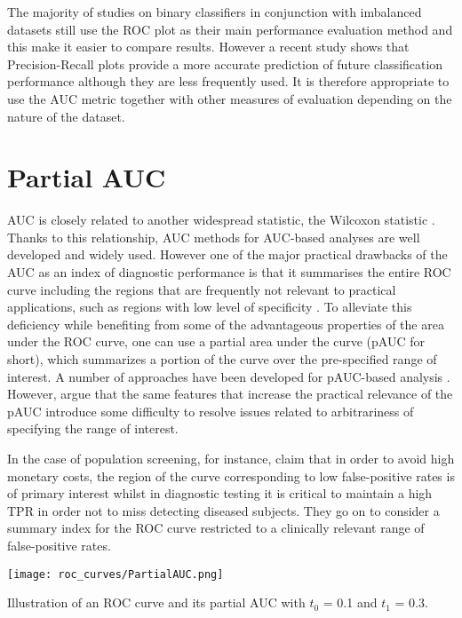 The majority of studies on binary classifiers in conjunction with imbalanced datasets still use the ROC plot as their main performance evaluation method and this make it easier to compare results. However a recent study \citep{saito2015prplotimbdata} shows that Precision-Recall plots provide a more accurate prediction of future classification performance although they are less frequently used. It is therefore appropriate to use the AUC metric together with other measures of evaluation depending on the nature of the dataset.

\section{Partial AUC} 
AUC is closely related to another widespread statistic, the Wilcoxon statistic \citep{hanley1982useauc}. Thanks to this relationship, AUC methods for AUC-based analyses are well developed and widely used. However one of the major practical drawbacks of the AUC as an index of diagnostic performance is that it summarises the entire ROC curve including the regions that are frequently not relevant to practical applications, such as regions with low level of specificity \citep{ma2013paucdiagperf}. To alleviate this deficiency while benefiting from some of the advantageous properties of the area under the ROC curve, one can use a partial area under the curve (pAUC for short), which summarizes a portion of the curve over the pre-specified range of interest. A number of approaches have been developed for pAUC-based analysis \citep{dodd2003pauc,he2010nonparagenomic}. However, \citet{ma2013paucdiagperf} argue that the same features that increase the practical relevance of the pAUC introduce some difficulty to resolve issues related to arbitrariness of specifying the range of interest. 

In the case of population screening, for instance, \citet{dodd2003pauc} claim that in order to avoid high monetary costs, the region of the curve corresponding to low false-positive rates is of primary interest whilst in diagnostic testing it is critical to maintain a high TPR in order not to miss detecting diseased subjects. They go on to consider a summary index for the ROC curve restricted to a clinically relevant range of false-positive rates.

\begin{marginfigure}
	\texttt{[image: roc\_curves/PartialAUC.png]}
	\caption{Illustration of an ROC curve and its partial AUC with $t_{0}$ = 0.1 and $t_{1}$ = 0.3.}
	\label{fig:partial-auc}
\end{marginfigure}

